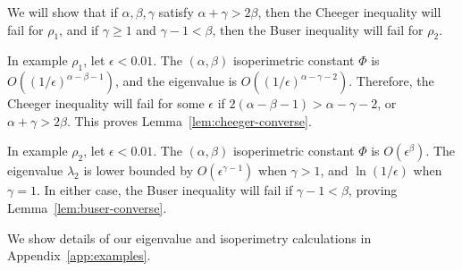 We will show that if $\alpha, \beta, \gamma$ satisfy $\alpha +
\gamma > 2\beta$, then the Cheeger inequality will fail for
$\rho_1$, and if $\gamma \geq 1$ and $\gamma - 1 < \beta$, then the Buser inequality
will fail for $\rho_2$.

In example $\rho_1$, let $\epsilon < 0.01$. The $(\alpha, \beta)$ isoperimetric constant
$\Phi$ is $O((1/\epsilon)^{\alpha - \beta - 1})$, and the eigenvalue
is $O((1/\epsilon)^{\alpha - \gamma - 2})$.  Therefore, the Cheeger
inequality will fail for some $\epsilon$ if $2 (\alpha - \beta - 1) > \alpha - \gamma -
2$, or $\alpha + \gamma > 2\beta$. This proves
Lemma~\ref{lem:cheeger-converse}.

In example $\rho_2$, let $\epsilon < 0.01$. The $(\alpha, \beta)$ isoperimetric constant
$\Phi$ is $O(\epsilon^{\beta})$. The eigenvalue
$\lambda_2$ is lower bounded by $O(\epsilon^{\gamma-1})$ when
$\gamma > 1$, and $\ln(1/\epsilon)$ when $\gamma =1$.
In either case, the Buser inequality will fail if $\gamma - 1 <
\beta$, proving Lemma~\ref{lem:buser-converse}.

We show details of our eigenvalue and isoperimetry calculations
in Appendix~\ref{app:examples}.

